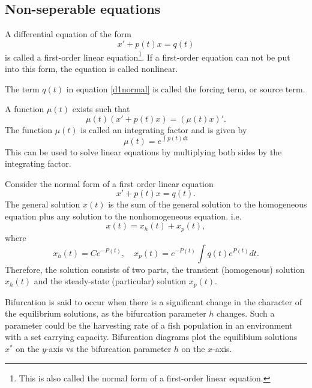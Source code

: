 \documentclass[nobib,notoc]{tufte-handout}
\begin{document}
\subsection{Non-seperable equations}
\begin{defi}
	A differential equation of the form
	\begin{equation}
		\label{d1normal}
		x'+p(t)x=q(t)
	\end{equation}
	is called a first-order linear equation\footnote{This is also called the normal form of a first-order linear equation.}. If a first-order equation can not be put into this form, the equation is called nonlinear.
\end{defi}
\begin{defi}
	The term \(q(t)\) in equation \ref{d1normal} is called the forcing term, or source term.
\end{defi}
\begin{defi}
	A function \(\mu(t)\) exists such that
	\begin{equation*}
		\mu(t)(x'+p(t)x)=(\mu(t)x)'.
	\end{equation*}
	The function \(\mu(t)\) is called an integrating factor and is given by
	\begin{equation*}
		\mu(t)=e^{\int p(t)dt}
	\end{equation*}
	This can be used to solve linear equations by multiplying both sides by the integrating factor.
\end{defi}
\begin{thm}[Structure]
	Consider the normal form of a first order linear equation
	\begin{equation*}
		x'+p(t)x=q(t).
	\end{equation*}
	The general solution \(x(t)\) is the sum of the general solution to the homogeneous equation plus any solution to the nonhomogeneous equation. i.e.
	\begin{equation*}
		x(t)=x_h(t)+x_p(t),
	\end{equation*}
	where
	\begin{equation*}
		x_h(t)=Ce^{-P(t)},\quad x_p(t)=e^{-P(t)}\int q(t)e^{P(t)}dt.
	\end{equation*}
	Therefore, the solution consists of two parts, the transient (homogenous) solution \(x_h(t)\) and the steady-state (particular) solution \(x_p(t)\).
\end{thm}
\begin{defi}[Bifurcation]
	Bifurcation is said to occur when there is a significant change in the character of the equilibrium solutions, as the bifurcation parameter \(h\) changes. Such a parameter could be the harvesting rate of a fish population in an environment with a set carrying capacity. Bifurcation diagrams plot the equilibium solutions \(x^{*}\) on the \(y\)-axis vs the bifurcation parameter \(h\) on the \(x\)-axis.
\end{defi}
\end{document}
